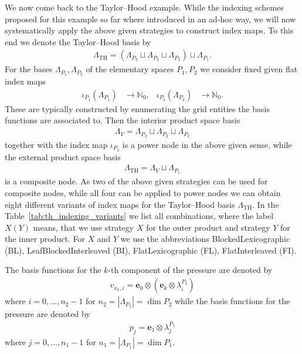 \documentclass[a4paper,10pt,headings=normal,bibliography=totoc]{scrartcl}
\begin{document}
We now come back to the Taylor--Hood example.
While the indexing schemes proposed for this example so far where
introduced in an ad-hoc way, we will now systematically apply
the above given strategies to construct index maps.
To this end we denote the Taylor--Hood basis by
\begin{align*}
 \Lambda_\text{TH}
  = (\Lambda_{P_2} \sqcup \Lambda_{P_2} \sqcup \Lambda_{P_2}) \sqcup \Lambda_{P_1}.
\end{align*}
For the bases $\Lambda_{P_1}, \Lambda_{P_2}$
of the elementary spaces $P_1,P_2$ we consider fixed given flat index maps
\begin{align*}
  \iota_{P_1}(\Lambda_{P_1}) &\to \mathbb{N}_0, &
  \iota_{P_2}(\Lambda_{P_2}) &\to \mathbb{N}_0.
\end{align*}
These are typically constructed by enumerating the grid entities
the basis functions are associated to.
Then the interior product space basis
\begin{align*}
  \Lambda_V = \Lambda_{P_2} \sqcup \Lambda_{P_2} \sqcup \Lambda_{P_2}
\end{align*}
together with the index map $\iota_{P_2}$ is a power node in the above
given sense, while the external product space basis
\begin{align*}
 \Lambda_\text{TH}
  = \Lambda_V \sqcup \Lambda_{P_1}
\end{align*}
is a composite node. As two of the above given strategies can be used
for composite nodes, while all four can be applied to power nodes
we can obtain eight different variants of index maps for the Taylor--Hood basis
$\Lambda_{\text{TH}}$.
In the Table~\ref{tab:th_indexing_variants} we list all combinations, where the label $X(Y)$
means, that we use strategy $X$ for the outer product and strategy $Y$
for the inner product. For $X$ and $Y$ we use the abbreviations
BlockedLexicographic (BL), LeafBlockedInterleaved (BI), FlatLexicographic (FL), FlatInterleaved (FI).

The basis functions for the $k$-th component of the pressure
are denoted by
\begin{align*}
  v_{x_k,i} = \mathbf{e}_0 \otimes (\mathbf{e}_k \otimes \lambda^{P_2}_i)
\end{align*}
where $i=0,\dots,n_2-1$ for $n_2=|\Lambda_{P_2}|= \operatorname{dim} P_2$
while the basis functions for the pressure are denoted by
\begin{align*}
  p_{j} = \mathbf{e}_1 \otimes \lambda^{P_1}_j
\end{align*}
where $j=0,\dots,n_1-1$ for $n_1=|\Lambda_{P_1}|= \operatorname{dim} P_1$.
\end{document}
